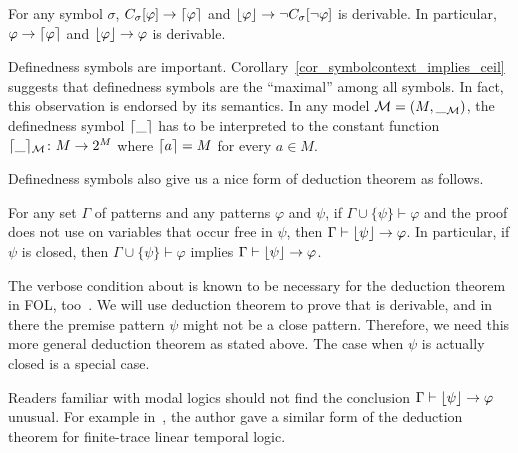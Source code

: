 \documentclass{amsart}
\begin{document}
\begin{corollary}
\label{cor_symbolcontext_implies_ceil}
For any symbol $\sigma$, 
$C_{\sigma}[\varphi] \to \lceil\varphi\rceil$
and 
$\lfloor\varphi\rfloor \to \neg C_{\sigma}[ \neg \varphi] $
is derivable.
In particular, 
$\varphi \to \lceil\varphi\rceil$
and
$\lfloor\varphi\rfloor \to \varphi$ is derivable.
\end{corollary}

Definedness symbols are important.
Corollary~\ref{cor_symbolcontext_implies_ceil}
suggests that definedness symbols are the ``maximal'' among all symbols.
In fact, this observation is endorsed by its semantics.
In any model $\mathcal{M} = (M, \__{\mathcal{M}})$, 
the definedness symbol $\lceil\_\rceil$
has to be interpreted to the constant function
$\lceil\_\rceil_{\mathcal{M}} \colon M \to 2^{M}$
where $\lceil a\rceil = M$ for every $a \in M$.

Definedness symbols also give us a nice form of deduction theorem as follows.

\begin{theorem}
\label{thm_deduction_theorem}
	For any set $\Gamma$ of patterns and any patterns $\varphi$ and $\psi$,
	if $\Gamma \cup \{ \psi \} \vdash \varphi$ and the proof does not use
	\universalgeneralization on variables that occur free in $\psi$,
	then $\Gamma \vdash \lfloor\psi\rfloor \to \varphi$.
	In particular, if $\psi$ is closed,
	then $\Gamma \cup \{ \psi \} \vdash \varphi$
	implies $\Gamma \vdash \lfloor\psi\rfloor \to \varphi$.
\end{theorem}

The verbose condition about \universalgeneralization
is known to be necessary for the deduction theorem in FOL, 
too~\cite{hamilton1988logic}.
We will use deduction theorem to prove that
\equalityelimination is derivable, and in there the premise pattern
$\psi$ might not be a close pattern.
Therefore, we need this more general deduction theorem as stated above.
The case when $\psi$ is actually closed is a special case.

Readers familiar with modal logics should not find the conclusion
$\Gamma \vdash \lfloor\psi\rfloor \to \varphi$ unusual.
For example in~\cite{rosu-2016-rv}, the author gave a similar form of
the deduction theorem for finite-trace linear temporal logic.
\end{document}
